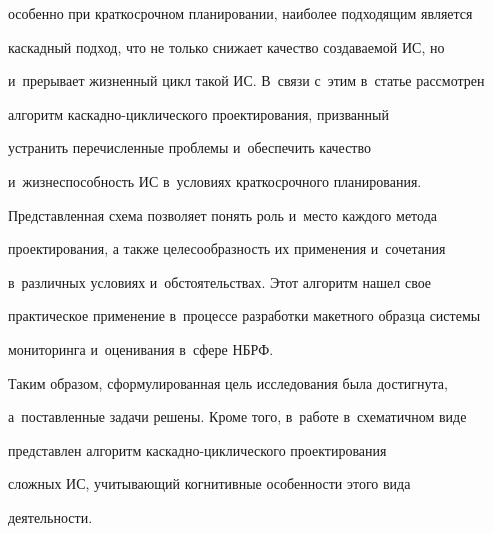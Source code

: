 особенно при краткосрочном планировании, наиболее подходящим является 


каскадный подход, что не только снижает качество создаваемой ИС, но 


и~прерывает жизненный цикл такой ИС. В~связи с~этим в~статье рассмотрен 


алгоритм кас\-кад\-но-цик\-ли\-че\-ско\-го проектирования, призванный 


устранить перечисленные проблемы и~обеспечить качество 


и~жизнеспособность ИС в~условиях краткосрочного планирования. 


Пред\-став\-лен\-ная схема позволяет понять роль и~место каждого метода 


проектирования, а также целесообразность их применения и~сочетания 


в~различных условиях и~обстоятельствах. Этот алгоритм нашел свое 


практическое применение в~процессе разработки макетного образца системы 


мониторинга и~оценивания в~сфере НБРФ.


    


    Таким образом, сформулированная цель исследования была достигнута, 


а~поставленные задачи решены. Кроме того, в~работе в~схематичном виде 


представлен алгоритм кас\-кад\-но-цик\-ли\-че\-ско\-го проектирования 


сложных ИС, учитывающий когнитивные особенности этого вида 


деятельности. 





